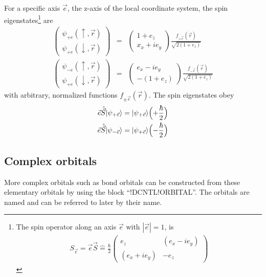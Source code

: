 \documentclass[final,12pt,makeidx,DIV=calc]{article}
\begin{document}
{{{{{{For a specific axis $\vec{e}$, the z-axis of the local coordinate
system, the spin eigenstates\footnote{The spin operator along an axis
  $\vec{e}$ with $|\vec{e}|=1$, is
\begin{eqnarray}
S_{\vec{e}}
=\vec{e}\vec{S}
\hat{=}\frac{\hbar}{2}\left(\begin{array}{cc}
e_z & (e_x-ie_y)\\(e_x+ie_y)& -e_z\end{array}\right)
\end{eqnarray}}
 are
\begin{eqnarray}
\left(\begin{array}{c}
\psi_{+e}(\uparrow,\vec{r})\\\psi_{+e}(\downarrow,\vec{r})
\end{array}\right)
&=&
\left(\begin{array}{c}
1+e_z\\x_x+ie_y
\end{array}\right)\frac{f_{+\vec{e}}(\vec{r})}{\sqrt{2(1+e_z)}}
%
\nonumber\\
%
\left(\begin{array}{c}
\psi_{-e}(\uparrow,\vec{r})\\\psi_{+e}(\downarrow,\vec{r})
\end{array}\right)
&=&
\left(\begin{array}{c}
e_x-ie_y\\-(1+e_z)
\end{array}\right)\frac{f_{-\vec{e}}(\vec{r})}{\sqrt{2(1+e_z)}}
\end{eqnarray}
with arbitrary, normalized functions $f_{\pm\vec{e}}(\vec{r})$.
The spin eigenstates obey
\begin{eqnarray}
\vec{e}\hat{\vec{S}}|\psi_{+\vec{e}}\rangle=|\psi_{+\vec{e}}\rangle
\Bigl(+\frac{\hbar}{2}\Bigr)
\nonumber\\
\vec{e}\hat{\vec{S}}|\psi_{-\vec{e}}\rangle=|\psi_{+\vec{e}}\rangle
\Bigl(-\frac{\hbar}{2}\Bigr)
\end{eqnarray}







\subsection{Complex orbitals}
More complex orbitals such as bond orbitals can be constructed from
these elementary orbitals by using the block ``!DCNTL!ORBITAL''. The
orbitals are named and can be referred to later by their name.

}}}}}}
\end{document}

